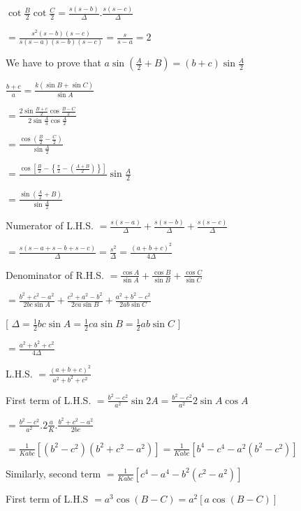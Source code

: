   $\cot\frac{B}{2}\cot\frac{C}{2} = \frac{s(s - b)}{\Delta}.\frac{s(s - c)}{\Delta}$

  $=\frac{s^2(s - b)(s - c)}{s(s - a)(s - b)(s - c)} = \frac{s}{s - a} = 2$

\item We have to prove that $a\sin\left(\frac{A}{2} + B\right) = (b + c)\sin\frac{A}{2}$

  $\frac{b + c}{a} = \frac{k(\sin B + \sin C)}{\sin A}$

  $= \frac{2\sin\frac{B + c}{2}\cos\frac{B - C}{2}}{2\sin\frac{A}{3}\cos\frac{A}{2}}$

  $= \frac{\cos\left(\frac{B}{2} - \frac{C}{2}\right)}{\sin\frac{A}{2}}$

  $= \frac{\cos\left[\frac{B}{2} - \left\{\frac{\pi}{2} - \left(\frac{A + B}{2}\right)\right\}\right]}{}\sin\frac{A}{2}$

  $= \frac{\sin\left(\frac{A}{2} + B\right)}{\sin\frac{A}{2}}$

\item Numerator of L.H.S. $= \frac{s(s - a)}{\Delta} + \frac{s(s - b)}{\Delta} + \frac{s(s - c)}{\Delta}$

  $= \frac{s(s - a + s - b + s - c)}{\Delta} = \frac{s^2}{\Delta} = \frac{(a + b + c)^2}{4\Delta}$

  Denominator of R.H.S. $= \frac{\cos A}{\sin A} + \frac{\cos B}{\sin B} + \frac{\cos C}{\sin C}$

  $= \frac{b^2 + c^2 - a^2}{2bc\sin A} + \frac{c^2 + a^2 - b^2}{2ca\sin B} + \frac{a^2 + b^2 - c^2}{2ab\sin C}$

  [ $\Delta = \frac{1}{2}bc\sin A = \frac{1}{2}ca\sin B = \frac{1}{2}ab\sin C$ ]

  $= \frac{a^2 + b^2 + c^2}{4\Delta}$

  L.H.S. $= \frac{(a + b + c)^2}{a^2 + b^2 + c^2}$

\item First term of L.H.S. $= \frac{b^2 - c^2}{a^2}\sin2A = \frac{b^2 - c^2}{a^2}2\sin A\cos A$

  $= \frac{b^2 - c^2}{a^2}.2\frac{a}{K}.\frac{b^2 + c^2 - a^2}{2bc}$

  $= \frac{1}{Kabc}[(b^2 - c^2)(b^2 + c^2 - a^2)] = \frac{1}{Kabc}[b^4 - c^4 -a^2(b^2 - c^2)]$

  Similarly, second term $= \frac{1}{Kabc}[c^4 - a^4 - b^2(c^2 - a^2)]$

\item First term of L.H.S $= a^3\cos(B - C) = a^2[a\cos(B - C)]$

